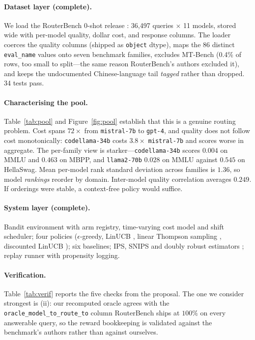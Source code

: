 \documentclass[10pt,twocolumn]{article}
\begin{document}
\paragraph{Dataset layer (complete).} We load the RouterBench 0-shot release
\citep{hu2024routerbench}: 36{,}497 queries $\times$ 11 models, stored wide with
per-model quality, dollar cost, and response columns. The loader coerces the
quality columns (shipped as \texttt{object} dtype), maps the 86 distinct
\texttt{eval\_name} values onto seven benchmark families, excludes MT-Bench
(0.4\% of rows, too small to split---the same reason RouterBench's authors
excluded it), and keeps the undocumented Chinese-language tail \emph{tagged}
rather than dropped. 34 tests pass.

\paragraph{Characterising the pool.} Table~\ref{tab:pool} and
Figure~\ref{fig:pool} establish that this is a genuine routing problem. Cost
spans $72\times$ from \texttt{mistral-7b} to \texttt{gpt-4}, and quality does
not follow cost monotonically: \texttt{codellama-34b} costs $3.8\times$
\texttt{mistral-7b} and scores worse in aggregate. The per-family view is
starker---\texttt{codellama-34b} scores $0.004$ on MMLU and $0.463$ on MBPP, and
\texttt{llama2-70b} $0.028$ on MMLU against $0.545$ on HellaSwag. Mean per-model
rank standard deviation across families is $1.36$, so model \emph{rankings}
reorder by domain. Inter-model quality correlation averages $0.249$. If
orderings were stable, a context-free policy would suffice.

\paragraph{System layer (complete).} Bandit environment with arm registry,
time-varying cost model and shift scheduler; four policies
($\epsilon$-greedy, LinUCB \citep{li2010contextual}, linear Thompson sampling
\citep{agrawal2013thompson}, discounted LinUCB \citep{russac2019weighted});
six baselines; IPS, SNIPS and doubly robust estimators
\citep{dudik2011doubly}; replay runner with propensity logging.

\paragraph{Verification.} Table~\ref{tab:verif} reports the five checks from the
proposal. The one we consider strongest is (ii): our recomputed oracle agrees
with the \texttt{oracle\_model\_to\_route\_to} column RouterBench ships at
$100\%$ on every answerable query, so the reward bookkeeping is validated
against the benchmark's authors rather than against ourselves.
\end{document}
